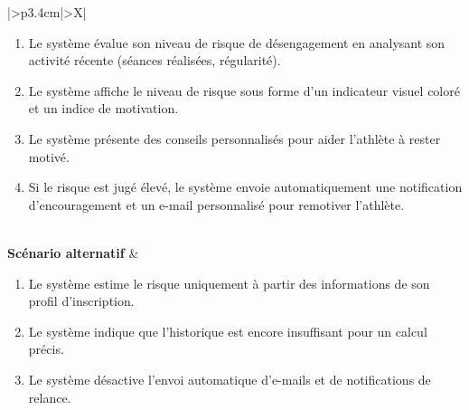 ﻿\documentclass[a4paper,12pt]{report}
\begin{document}
\begin{table}[H]
\begin{tabularx}{\textwidth}{|>{\RaggedRight\arraybackslash}p{3.4cm}|>{\RaggedRight\arraybackslash}X|}
\begin{minipage}[t]{\linewidth}
\begin{enumerate}[label=\arabic*., leftmargin=*, topsep=0pt, itemsep=1pt]
    \item Le système évalue son niveau de risque de désengagement en analysant son activité récente (séances réalisées, régularité).
    \item Le système affiche le niveau de risque sous forme d'un indicateur visuel coloré et un indice de motivation.
    \item Le système présente des conseils personnalisés pour aider l'athlète à rester motivé.
    \item Si le risque est jugé élevé, le système envoie automatiquement une notification d'encouragement et un e-mail personnalisé pour remotiver l'athlète.
\end{enumerate}
\vspace{2pt}
\end{minipage} \\
\hline
\textbf{Scénario alternatif } &
\begin{minipage}[t]{\linewidth}
\vspace{2pt}

\begin{enumerate}[label=\arabic*., leftmargin=*, topsep=2pt, itemsep=1pt]
    \item Le système estime le risque uniquement à partir des informations de son profil d'inscription.
    \item Le système indique que l'historique est encore insuffisant pour un calcul précis.
    \item Le système désactive l'envoi automatique d'e-mails et de notifications de relance.
\end{enumerate}
\vspace{2pt}
\end{minipage} \\
\hline
\end{tabularx}
\fussy
\end{table}
\end{document}
